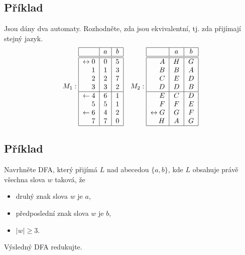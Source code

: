 \subsection{Příklad}
Jsou dány dva automaty. Rozhodněte, zda jsou ekvivalentní, tj. zda přijímají stejný jazyk.
\[
M_1:
\begin{tabular}{|r|c|c|}
    \hline
    & $a$ & $b$\\
    \hline
    \hline
    $\leftrightarrow 0$& $0$ & $5$\\
    $1$                & $1$ & $3$\\
    $2$                & $2$ & $7$\\
    $3$                & $3$ & $2$\\
    \hline
    $\leftarrow 4$     & $6$ & $1$\\
    $5$                & $5$ & $1$\\
    $\leftarrow 6$     & $4$ & $2$\\
    $7$                & $7$ & $0$\\
    \hline
\end{tabular}
\quad
M_2:
\begin{tabular}{|r|c|c|}
    \hline
    & $a$ & $b$\\
    \hline
    \hline
    $A$                & $H$ & $G$\\
    $B$                & $B$ & $A$\\
    $C$                & $E$ & $D$\\
    $D$                & $D$ & $B$\\
    \hline
    $E$                & $C$ & $D$\\
    $F$                & $F$ & $E$\\
    $\leftrightarrow G$& $G$ & $F$\\
    $H$                & $A$ & $G$\\
    \hline
\end{tabular}
\]

\subsection{Příklad}
Navrhněte DFA, který přijímá $L$ nad abecedou $\{a,b\}$, kde $L$ obsahuje právě všechna slova $w$ taková, že
\begin{itemize}[noitemsep]
    \item druhý znak slova $w$ je $a$,
    \item předposlední znak slova $w$ je $b$,
    \item $|w| \geq 3$.
\end{itemize}
Výsledný DFA redukujte.